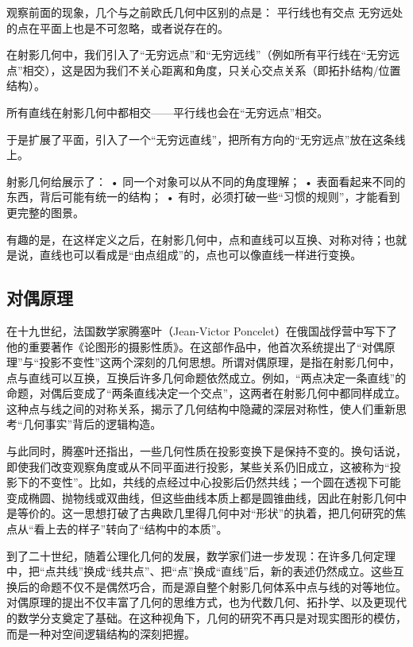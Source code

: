观察前面的现象，几个与之前欧氏几何中区别的点是：
平行线也有交点
无穷远处的点在平面上也是不可忽略，或者说存在的。




在射影几何中，我们引入了“无穷远点”和“无穷远线”（例如所有平行线在“无穷远点”相交），这是因为我们不关心距离和角度，只关心交点关系（即拓扑结构/位置结构）。

所有直线在射影几何中都相交——平行线也会在“无穷远点”相交。

于是扩展了平面，引入了一个“无穷远直线”，把所有方向的“无穷远点”放在这条线上。

射影几何给展示了：
	•	同一个对象可以从不同的角度理解；
	•	表面看起来不同的东西，背后可能有统一的结构；
	•	有时，必须打破一些“习惯的规则”，才能看到更完整的图景。

有趣的是，在这样定义之后，在射影几何中，点和直线可以互换、对称对待；也就是说，直线也可以看成是“由点组成”的，点也可以像直线一样进行变换。


\subsection{对偶原理}

在十九世纪，法国数学家腾塞叶（Jean-Victor Poncelet）在俄国战俘营中写下了他的重要著作《论图形的摄影性质》。在这部作品中，他首次系统提出了“对偶原理”与“投影不变性”这两个深刻的几何思想。所谓对偶原理，是指在射影几何中，点与直线可以互换，互换后许多几何命题依然成立。例如，“两点决定一条直线”的命题，对偶后变成了“两条直线决定一个交点”，这两者在射影几何中都同样成立。这种点与线之间的对称关系，揭示了几何结构中隐藏的深层对称性，使人们重新思考“几何事实”背后的逻辑构造。

与此同时，腾塞叶还指出，一些几何性质在投影变换下是保持不变的。换句话说，即使我们改变观察角度或从不同平面进行投影，某些关系仍旧成立，这被称为“投影下的不变性”。比如，共线的点经过中心投影后仍然共线；一个圆在透视下可能变成椭圆、抛物线或双曲线，但这些曲线本质上都是圆锥曲线，因此在射影几何中是等价的。这一思想打破了古典欧几里得几何中对“形状”的执着，把几何研究的焦点从“看上去的样子”转向了“结构中的本质”。

到了二十世纪，随着公理化几何的发展，数学家们进一步发现：在许多几何定理中，把“点共线”换成“线共点”、把“点”换成“直线”后，新的表述仍然成立。这些互换后的命题不仅不是偶然巧合，而是源自整个射影几何体系中点与线的对等地位。对偶原理的提出不仅丰富了几何的思维方式，也为代数几何、拓扑学、以及更现代的数学分支奠定了基础。在这种视角下，几何的研究不再只是对现实图形的模仿，而是一种对空间逻辑结构的深刻把握。


